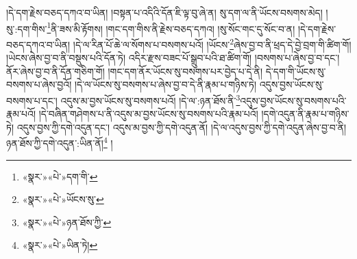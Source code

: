 །དེ་དག་རྗེས་བཅད་དཀའ་བ་ཡིན། །བསྟན་པ་འདིའི་དོན་ཇི་ལྟ་བུ་ཞེ་ན། སུ་དག་ལ་ནི་ཡོངས་བསགས་མེད། །སུ་:དག་གིས་\footnote{«སྣར་»«པེ་»དག་གི་}ནི་ཟས་མི་རྟོགས། །གང་དག་གིས་ནི་རྗེས་བཅད་དཀའ། །སུ་སོང་གང་དུ་སོང་བ་ན། །དེ་དག་རྗེས་བཅད་དཀའ་བ་ཡིན། །དེ་ལ་རིན་པོ་ཆེ་ལ་སོགས་པ་བསགས་པའོ། །ཡོངས་\footnote{«སྣར་»«པེ་»ཡོངས་སུ་}ཞེས་བྱ་བ་ནི་ཕྲད་དེ་བྱེ་བྲག་གི་ཚིག་གོ། །ཡེངས་ཞེས་བྱ་བ་ནི་བསྡུས་པའི་དོན་ཏེ། འདིར་རྫས་བཟང་པོ་སྒྲུབ་པའི་ཐ་ཚིག་གོ། །བསགས་པ་ཞེས་བྱ་བ་དང་། ནོར་ཞེས་བྱ་བ་ནི་དོན་གཅིག་གོ། །གང་དག་ནོར་ཡོངས་སུ་བསགས་པར་བྱེད་པ་དེ་ནི། དེ་དག་གི་ཡོངས་སུ་བསགས་པ་ཞེས་བྱའོ། །དེ་ལ་ཡོངས་སུ་བསགས་པ་ཞེས་བྱ་བ་དེ་ནི་རྣམ་པ་གཉིས་ཏེ། འདུས་བྱས་ཡོངས་སུ་བསགས་པ་དང་། འདུས་མ་བྱས་ཡོངས་སུ་བསགས་པའོ། །དེ་ལ་:ཉན་ཐོས་ནི་\footnote{«སྣར་»«པེ་»ཉན་ཐོས་ཀྱི་}འདུས་བྱས་ཡོངས་སུ་བསགས་པའི་རྣམ་པའོ། །དེ་བཞིན་གཤེགས་པ་ནི་འདུས་མ་བྱས་ཡོངས་སུ་བསགས་པའི་རྣམ་པའོ། །དགེ་འདུན་ནི་རྣམ་པ་གཉིས་ཏེ། འདུས་བྱས་ཀྱི་དགེ་འདུན་དང་། འདུས་མ་བྱས་ཀྱི་དགེ་འདུན་ནོ། །དེ་ལ་འདུས་བྱས་ཀྱི་དགེ་འདུན་ཞེས་བྱ་བ་ནི། ཉན་ཐོས་ཀྱི་དགེ་འདུན་:ཡིན་ནོ།\footnote{«སྣར་»«པེ་»ཡིན་ཏེ།} །
